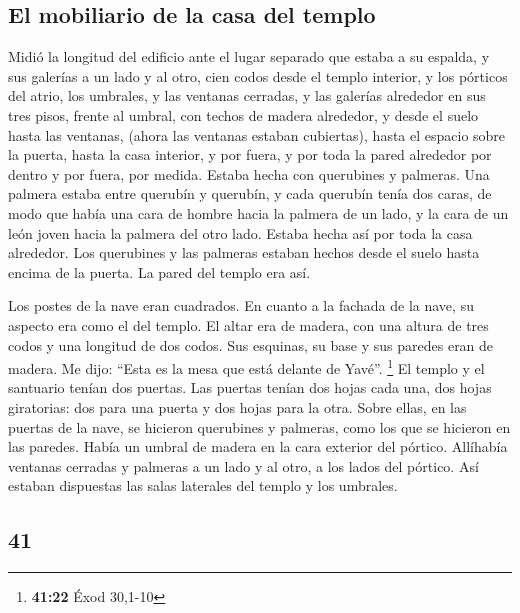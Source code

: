 \begin{paracol}{2}
\hypertarget{el-mobiliario-de-la-casa-del-templo}{%
\subsection{El mobiliario de la casa del
templo}\label{el-mobiliario-de-la-casa-del-templo}}

 Midió la longitud del edificio ante el lugar separado
que estaba a su espalda, y sus galerías a un lado y al otro, cien codos
desde el templo interior, y los pórticos del atrio,  los
umbrales, y las ventanas cerradas, y las galerías alrededor en sus tres
pisos, frente al umbral, con techos de madera alrededor, y desde el
suelo hasta las ventanas, (ahora las ventanas estaban cubiertas),
 hasta el espacio sobre la puerta, hasta la casa
interior, y por fuera, y por toda la pared alrededor por dentro y por
fuera, por medida.  Estaba hecha con querubines y
palmeras. Una palmera estaba entre querubín y querubín, y cada querubín
tenía dos caras,  de modo que había una cara de hombre
hacia la palmera de un lado, y la cara de un león joven hacia la palmera
del otro lado. Estaba hecha así por toda la casa alrededor.
 Los querubines y las palmeras estaban hechos desde el
suelo hasta encima de la puerta. La pared del templo era así.

 Los postes de la nave eran cuadrados. En cuanto a la
fachada de la nave, su aspecto era como el del templo. 
El altar era de madera, con una altura de tres codos y una longitud de
dos codos. Sus esquinas, su base y sus paredes eran de madera. Me dijo:
``Esta es la mesa que está delante de Yavé''. \footnote{\textbf{41:22}
  Éxod 30,1-10}  El templo y el santuario tenían dos
puertas.  Las puertas tenían dos hojas cada una, dos
hojas giratorias: dos para una puerta y dos hojas para la otra.
 Sobre ellas, en las puertas de la nave, se hicieron
querubines y palmeras, como los que se hicieron en las paredes. Había un
umbral de madera en la cara exterior del pórtico. 
Allíhabía ventanas cerradas y palmeras a un lado y al otro, a los lados
del pórtico. Así estaban dispuestas las salas laterales del templo y los
umbrales.

\switchcolumn
\begin{otherlanguage}{english}

\hypertarget{section-81}{%
\section{41}\label{section-81}}


\end{otherlanguage}
\end{paracol}
